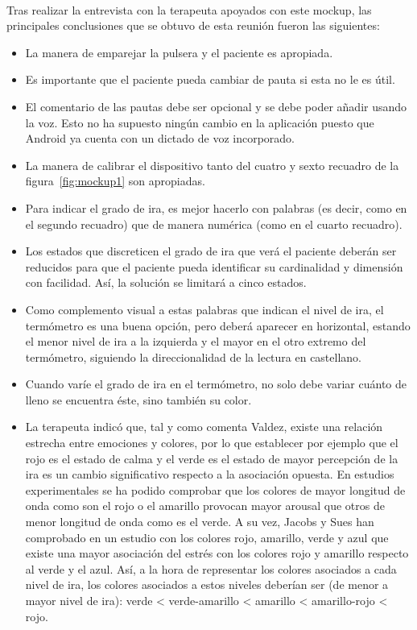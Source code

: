 \paragraph{}
Tras realizar la entrevista con la terapeuta apoyados con este mockup, las principales conclusiones que se obtuvo de esta reunión fueron las siguientes:
\begin{itemize}
    \item La manera de emparejar la pulsera y el paciente es apropiada.
    \item Es importante que el paciente pueda cambiar de pauta si esta no le es útil.
    \item El comentario de las pautas debe ser opcional y se debe poder añadir usando la voz. Esto no ha supuesto ningún cambio en la aplicación puesto que Android ya cuenta con un dictado de voz incorporado.
    \item La manera de calibrar el dispositivo tanto del cuatro y sexto recuadro de la figura~\ref{fig:mockup1} son apropiadas.
    \item Para indicar el grado de ira, es mejor hacerlo con palabras (es decir, como en el segundo recuadro) que de manera numérica (como en el cuarto recuadro).
    \item Los estados que discreticen el grado de ira que verá el paciente deberán ser reducidos para que el paciente pueda identificar su cardinalidad y dimensión con facilidad. Así, la solución se limitará a cinco estados.
    \item Como complemento visual a estas palabras que indican el nivel de ira, el termómetro es una buena opción, pero deberá aparecer en horizontal, estando el menor nivel de ira a la izquierda y el mayor en el otro extremo del termómetro, siguiendo la direccionalidad de la lectura en castellano.
    \item Cuando varíe el grado de ira en el termómetro, no solo debe variar cuánto de lleno se encuentra éste, sino también su color.
    \item La terapeuta indicó que, tal y como comenta Valdez\citeyear{valdez1994effects}, existe una relación estrecha entre emociones y colores, por lo que establecer por ejemplo que el rojo es el estado de calma y el verde es el estado de mayor percepción de la ira es un cambio significativo respecto a la asociación opuesta. En estudios experimentales se ha podido comprobar que los colores de mayor longitud de onda como son el rojo o el amarillo provocan mayor arousal que otros de menor longitud de onda como es el verde. A su vez, Jacobs y Sues  \citeyear{jacobs1975effects} han comprobado en un estudio con los colores rojo, amarillo, verde y azul que existe una mayor asociación del estrés con los colores rojo y amarillo respecto al verde y el azul. Así, a la hora de representar los colores asociados a cada nivel de ira, los colores asociados a estos niveles deberían ser (de menor a mayor nivel de ira): verde < verde-amarillo < amarillo < amarillo-rojo < rojo.

\end{itemize}
